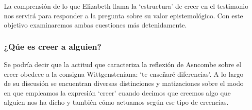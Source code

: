 La comprensión de lo que Elizabeth llama la `estructura' de creer en el testimonio nos servirá para responder a la pregunta sobre su valor epistemológico. Con este objetivo examinaremos ambas cuestiones más detenidamente.

\subsubsection{¿Qúe es creer a alguien?}

Se podría decir que la actitud que caracteriza la reflexión de Asncombe sobre el creer obedece a la consigna Wittgensteniana: \enquote*{te enseñaré diferencias}. A lo largo de su discusión se encuentran diversas distinciones y matizaciones sobre el modo en que empleamos la expresión `creer' cuando decimos que creemos algo que alguien nos ha dicho y también cómo actuamos según ese tipo de creencias.

